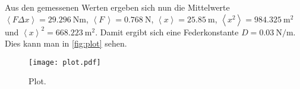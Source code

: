 Aus den gemessenen Werten ergeben sich nun die Mittelwerte $\left< F \Delta x \right> = \SI{29.296}{\newton\meter}$, $\left< F \, \right> = \SI{0.768}{\newton}$, $\left< x \right> = \SI{25.85}{\meter}$, $\left< x^2 \right> = \SI{984.325}{\meter\squared}$ und $\left< x \right> ^2 = \SI{668.223}{\meter\squared}$.
Damit ergibt sich eine Federkonstante $D=\SI{0.03}{\newton\per\meter}$.
Dies kann man in \autoref{fig:plot} sehen.

\begin{figure}
  \centering
  \texttt{[image: plot.pdf]}
  \caption{Plot.}
  \label{fig:plot}
\end{figure}

